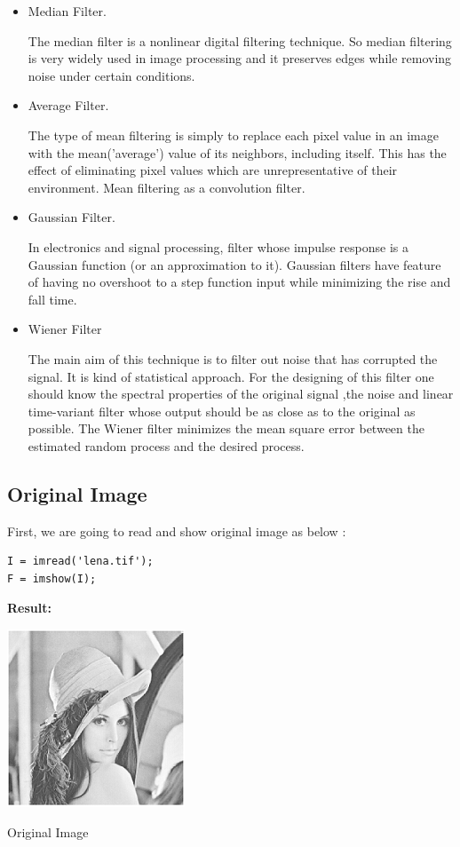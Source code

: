 \documentclass[10pt]{article}
\begin{document}
\begin{itemize}
	\item  Median Filter.

The median filter is a nonlinear digital filtering technique. So median filtering is very widely used in image processing and it preserves edges while removing noise under certain conditions.

	\item  Average Filter.
	
	The type of mean filtering is simply to replace each pixel value in an image with the mean('average') value of its neighbors, including itself. This has the effect of eliminating pixel values which are
	unrepresentative of their environment. Mean filtering as a convolution filter.
	
	\item  Gaussian Filter.
	
	In electronics and signal processing, filter whose impulse response is a Gaussian function (or an approximation to it). Gaussian filters have feature of having no overshoot to a step function input while minimizing the rise and fall time.

	\item Wiener Filter
	
	The main aim of this technique is to filter out noise that has corrupted the signal. It is kind of statistical approach. For the designing of this filter one should know the spectral properties of the original signal ,the noise and linear time-variant filter whose output should be as close as to the original as possible. The Wiener filter minimizes the mean square error between the estimated random process and the desired process.
	



\end{itemize}

 \subsection{Original Image }
First, we are going to read and show original image as below :
\begin{lstlisting}
I = imread('lena.tif');
F = imshow(I);
\end{lstlisting}

\textbf{Result:}
\begin{center}
	\includegraphics{lena1.png}

 Original Image
\end{center}
\end{document}
